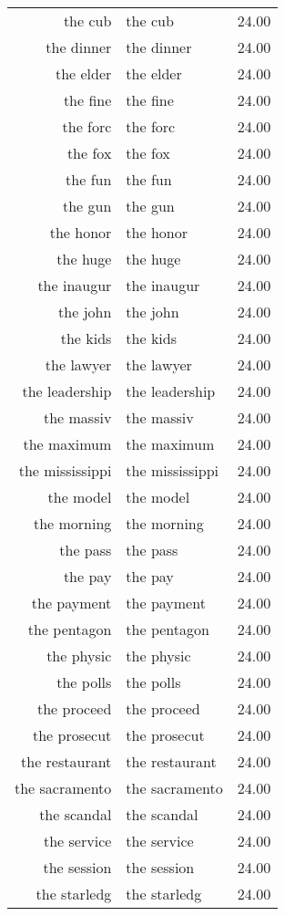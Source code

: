\begin{table}[ht]
\begin{tabular}{rlr}
  the cub & the cub & 24.00 \\ 
  the dinner & the dinner & 24.00 \\ 
  the elder & the elder & 24.00 \\ 
  the fine & the fine & 24.00 \\ 
  the forc & the forc & 24.00 \\ 
  the fox & the fox & 24.00 \\ 
  the fun & the fun & 24.00 \\ 
  the gun & the gun & 24.00 \\ 
  the honor & the honor & 24.00 \\ 
  the huge & the huge & 24.00 \\ 
  the inaugur & the inaugur & 24.00 \\ 
  the john & the john & 24.00 \\ 
  the kids & the kids & 24.00 \\ 
  the lawyer & the lawyer & 24.00 \\ 
  the leadership & the leadership & 24.00 \\ 
  the massiv & the massiv & 24.00 \\ 
  the maximum & the maximum & 24.00 \\ 
  the mississippi & the mississippi & 24.00 \\ 
  the model & the model & 24.00 \\ 
  the morning & the morning & 24.00 \\ 
  the pass & the pass & 24.00 \\ 
  the pay & the pay & 24.00 \\ 
  the payment & the payment & 24.00 \\ 
  the pentagon & the pentagon & 24.00 \\ 
  the physic & the physic & 24.00 \\ 
  the polls & the polls & 24.00 \\ 
  the proceed & the proceed & 24.00 \\ 
  the prosecut & the prosecut & 24.00 \\ 
  the restaurant & the restaurant & 24.00 \\ 
  the sacramento & the sacramento & 24.00 \\ 
  the scandal & the scandal & 24.00 \\ 
  the service & the service & 24.00 \\ 
  the session & the session & 24.00 \\ 
  the starledg & the starledg & 24.00 \\ 

\end{tabular}
\end{table}
